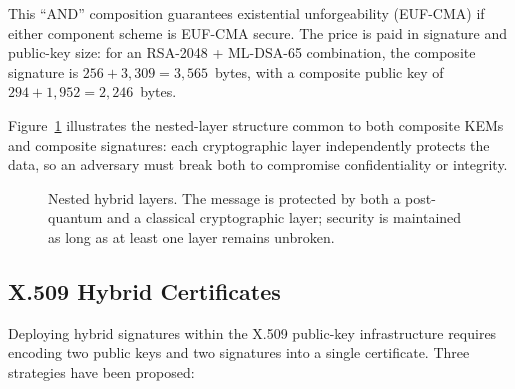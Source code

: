 This ``AND'' composition guarantees existential unforgeability (EUF-CMA) if either component scheme is EUF-CMA secure.  The price is paid in signature and public-key size: for an RSA-2048 + ML-DSA-65 combination, the composite signature is $256 + 3{,}309 = 3{,}565$~bytes, with a composite public key of $294 + 1{,}952 = 2{,}246$~bytes.

Figure~\ref{fig:ch13-hybrid-layers} illustrates the nested-layer structure common to both composite KEMs and composite signatures: each cryptographic layer independently protects the data, so an adversary must break both to compromise confidentiality or integrity.

\begin{figure}[t]
\centering
{}
\caption{Nested hybrid layers.  The message is protected by both a post-quantum and a classical cryptographic layer; security is maintained as long as at least one layer remains unbroken.}
\label{fig:ch13-hybrid-layers}
\end{figure}


\subsection{X.509 Hybrid Certificates}
\label{subsec:x509-hybrid}

Deploying hybrid signatures within the X.509 public-key infrastructure requires encoding two public keys and two signatures into a single certificate.  Three strategies have been proposed:

